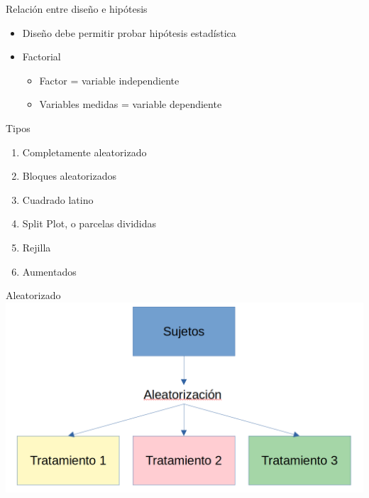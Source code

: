 \documentclass[
  11pt,
  ignorenonframetext,
]{beamer}
\begin{document}
\begin{frame}{Relación entre diseño e hipótesis}
\protect\hypertarget{relaciuxf3n-entre-diseuxf1o-e-hipuxf3tesis}{}
\begin{itemize}
\item
  Diseño debe permitir probar hipótesis estadística
\item
  Factorial

  \begin{itemize}
  \item
    Factor = variable independiente
  \item
    Variables medidas = variable dependiente
  \end{itemize}
\end{itemize}
\end{frame}

\begin{frame}{Tipos}
\protect\hypertarget{tipos}{}
\begin{enumerate}
\item
  Completamente aleatorizado
\item
  Bloques aleatorizados
\item
  Cuadrado latino
\item
  Split Plot, o parcelas divididas
\item
  Rejilla
\item
  Aumentados
\end{enumerate}
\end{frame}

\begin{frame}{Aleatorizado}
\protect\hypertarget{aleatorizado}{}
\includegraphics{Figuras-disenos/Aleatorizado.png}
\end{frame}
\end{document}
